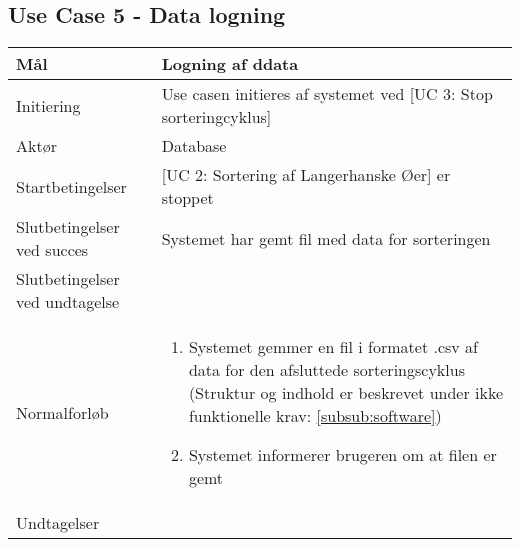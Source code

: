 \subsection{Use Case 5 - Data logning}
\begin{center}
		\begin{longtable}{ | m{4cm} | m{8cm}| } 
			\hline
			Mål & Logning af ddata \\ 
			\hline
			Initiering &  Use casen initieres af systemet ved [UC 3: Stop sorteringcyklus]\\
			\hline
			Aktør & Database \\ 
			\hline
			Startbetingelser & [UC 2: Sortering af Langerhanske Øer] er stoppet \\
			\hline	
			Slutbetingelser ved succes & Systemet har gemt fil med data for sorteringen \\
			\hline
			Slutbetingelser ved undtagelse &  \\
			\hline
			Normalforløb & \begin{enumerate}
				\item Systemet gemmer en fil i formatet .csv af data for den afsluttede sorteringscyklus (Struktur og indhold er beskrevet under ikke funktionelle krav: \ref{subsub:software})
				
				\item 	Systemet informerer brugeren om at filen er gemt
			\end{enumerate} \\ 
			\hline
			Undtagelser & \\
			\hline
		\end{longtable}
		
	\end{center}
	\pagebreak